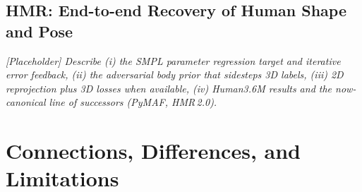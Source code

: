 \documentclass[11pt]{article}
\begin{document}
\subsection{HMR: End-to-end Recovery of Human Shape and Pose}
\textit{[Placeholder] Describe (i) the SMPL parameter regression target and
iterative error feedback, (ii) the adversarial body prior that sidesteps 3D
labels, (iii) 2D reprojection plus 3D losses when available, (iv) Human3.6M
results and the now-canonical line of successors (PyMAF, HMR\,2.0).}

\section{Connections, Differences, and Limitations}
\end{document}
